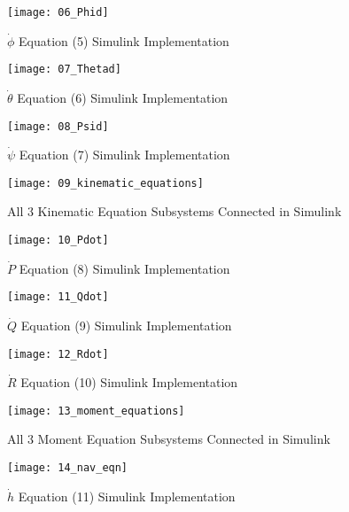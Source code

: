 \begin{figure}[h]
    \centering
    \texttt{[image: 06\_Phid]}
    \caption{$\dot{\phi}$ Equation (5) Simulink Implementation}
    \label{fig:phid}
\end{figure}

\begin{figure}[h]
    \centering
    \texttt{[image: 07\_Thetad]}
    \caption{$\dot{\theta}$ Equation (6) Simulink Implementation}
    \label{fig:thetad}
\end{figure}

\begin{figure}[h]
    \centering
    \texttt{[image: 08\_Psid]}
    \caption{$\dot{\psi}$ Equation (7) Simulink Implementation}
    \label{fig:psid}
\end{figure}

\begin{figure}[h]
    \centering
    \texttt{[image: 09\_kinematic\_equations]}
    \caption{All 3 Kinematic Equation Subsystems Connected in Simulink}
    \label{fig:kine_eqns}
\end{figure}

\begin{figure}[h]
    \centering
    \texttt{[image: 10\_Pdot]}
    \caption{$\dot{P}$ Equation (8) Simulink Implementation}
    \label{fig:Pd}
\end{figure}

\begin{figure}[h]
    \centering
    \texttt{[image: 11\_Qdot]}
    \caption{$\dot{Q}$ Equation (9) Simulink Implementation}
    \label{fig:Qd}
\end{figure}

\begin{figure}[h]
    \centering
    \texttt{[image: 12\_Rdot]}
    \caption{$\dot{R}$ Equation (10) Simulink Implementation}
    \label{fig:Rd}
\end{figure}

\begin{figure}[h]
    \centering
    \texttt{[image: 13\_moment\_equations]}
    \caption{All 3 Moment Equation Subsystems Connected in Simulink}
    \label{fig:mom_eqns}
\end{figure}

\begin{figure}[h]
    \centering
    \texttt{[image: 14\_nav\_eqn]}
    \caption{$\dot{h}$ Equation (11) Simulink Implementation}
    \label{fig:nav_eqn}
\end{figure}

